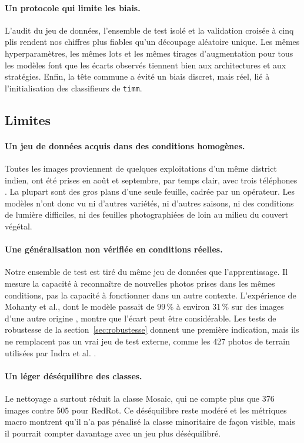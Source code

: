 \paragraph{Un protocole qui limite les biais.} L'audit du jeu de données, l'ensemble de test isolé et la validation croisée à cinq plis rendent nos chiffres plus fiables qu'un découpage aléatoire unique. Les mêmes hyperparamètres, les mêmes lots et les mêmes tirages d'augmentation pour tous les modèles font que les écarts observés tiennent bien aux architectures et aux stratégies. Enfin, la tête commune a évité un biais discret, mais réel, lié à l'initialisation des classifieurs de \texttt{timm}.

\subsection{Limites}

\paragraph{Un jeu de données acquis dans des conditions homogènes.} Toutes les images proviennent de quelques exploitations d'un même district indien, ont été prises en août et septembre, par temps clair, avec trois téléphones \cite{daphal2023enhancing}. La plupart sont des gros plans d'une seule feuille, cadrée par un opérateur. Les modèles n'ont donc vu ni d'autres variétés, ni d'autres saisons, ni des conditions de lumière difficiles, ni des feuilles photographiées de loin au milieu du couvert végétal.

\paragraph{Une généralisation non vérifiée en conditions réelles.} Notre ensemble de test est tiré du même jeu de données que l'apprentissage. Il mesure la capacité à reconnaître de nouvelles photos prises dans les mêmes conditions, pas la capacité à fonctionner dans un autre contexte. L'expérience de Mohanty et al., dont le modèle passait de 99\,\% à environ 31\,\% sur des images d'une autre origine \cite{mohanty2016using}, montre que l'écart peut être considérable. Les tests de robustesse de la section~\ref{sec:robustesse} donnent une première indication, mais ils ne remplacent pas un vrai jeu de test externe, comme les 427 photos de terrain utilisées par Indra et al. \cite{indra2026sugarcane}.

\paragraph{Un léger déséquilibre des classes.} Le nettoyage a surtout réduit la classe Mosaic, qui ne compte plus que 376 images contre 505 pour RedRot. Ce déséquilibre reste modéré et les métriques macro montrent qu'il n'a pas pénalisé la classe minoritaire de façon visible, mais il pourrait compter davantage avec un jeu plus déséquilibré.

